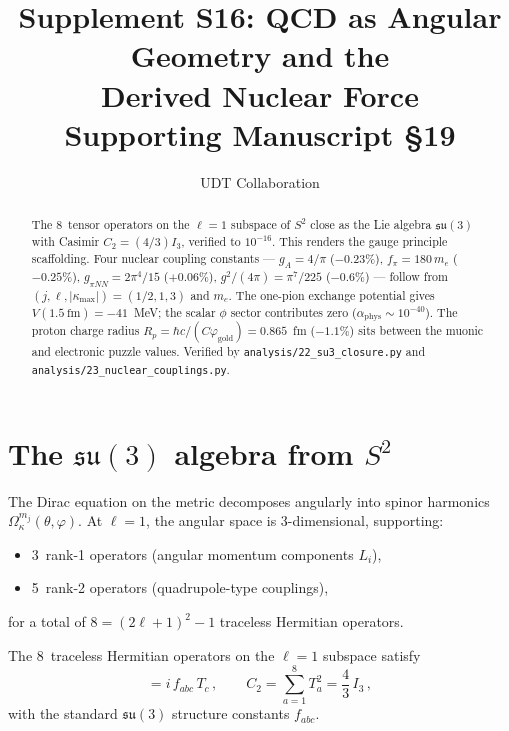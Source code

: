 \documentclass[11pt,letterpaper]{article}
\title{Supplement S16: QCD as Angular Geometry and the \\
Derived Nuclear Force \\
\large Supporting Manuscript \S19}
\author{UDT Collaboration}
\date{}
\numberwithin{equation}{section}
\begin{document}
\maketitle

\begin{abstract}
The 8~tensor operators on the $\ell = 1$ subspace of $S^2$ close as
the Lie algebra $\mathfrak{su}(3)$ with Casimir $C_2 = (4/3)I_3$,
verified to $10^{-16}$.  This renders the gauge principle scaffolding.
Four nuclear coupling constants --- $g_A = 4/\pi$ ($-0.23\%$),
$f_\pi = 180\,m_e$ ($-0.25\%$), $g_{\pi NN} = 2\pi^4/15$ ($+0.06\%$),
$g^2/(4\pi) = \pi^7/225$ ($-0.6\%$) --- follow from
$(j, \ell, |\kappa_\mathrm{max}|) = (1/2, 1, 3)$ and $m_e$.  The
one-pion exchange potential gives $V(1.5~\text{fm}) = -41$~MeV; the
scalar $\phi$ sector contributes zero ($\alpha_\mathrm{phys} \sim
10^{-40}$).  The proton charge radius $R_p = \hbar c/(C\varphi_\mathrm{gold})
= 0.865$~fm ($-1.1\%$) sits between the muonic and electronic puzzle
values.  Verified by \texttt{analysis/22\_su3\_closure.py} and
\texttt{analysis/23\_nuclear\_couplings.py}.
\end{abstract}

\tableofcontents

\section{The $\mathfrak{su}(3)$ algebra from $S^2$}
\label{sec:su3}

The Dirac equation on the metric decomposes angularly into spinor
harmonics $\Omega_\kappa^{m_j}(\theta, \varphi)$.  At $\ell = 1$,
the angular space is 3-dimensional, supporting:
\begin{itemize}
  \item 3~rank-1 operators (angular momentum components $L_i$),
  \item 5~rank-2 operators (quadrupole-type couplings),
\end{itemize}
for a total of $8 = (2\ell+1)^2 - 1$ traceless Hermitian operators.

\begin{theorem}[su(3) closure]
The 8~traceless Hermitian operators on the $\ell = 1$ subspace satisfy
\begin{equation}
  [T_a, T_b] = i\,f_{abc}\,T_c\,,
  \qquad C_2 = \sum_{a=1}^8 T_a^2 = \frac{4}{3}\,I_3\,,
\end{equation}
with the standard $\mathfrak{su}(3)$ structure constants $f_{abc}$.
\end{theorem}
\end{document}
